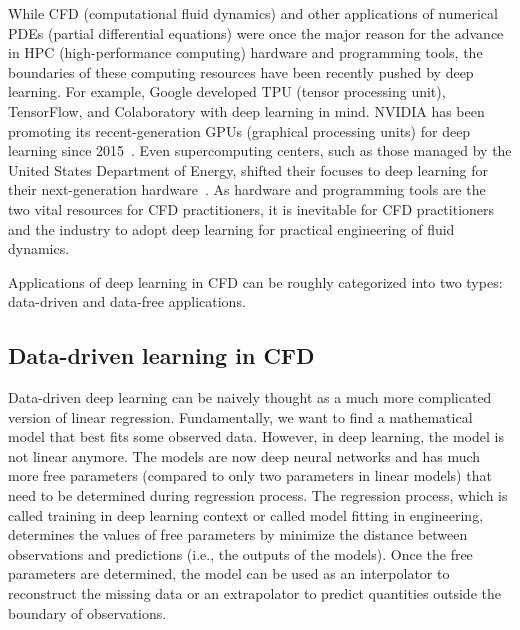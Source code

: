 
While CFD (computational fluid dynamics) and other applications of numerical PDEs (partial differential equations) were once the major reason for the advance in HPC (high-performance computing) hardware and programming tools, the boundaries of these computing resources have been recently pushed by deep learning.
For example, Google developed TPU (tensor processing unit), TensorFlow, and Colaboratory with deep learning in mind.
NVIDIA has been promoting its recent-generation GPUs (graphical processing units) for deep learning since 2015~\cite{buck_nvidias_2015}.
Even supercomputing centers, such as those managed by the United States Department of Energy, shifted their focuses to deep learning for their next-generation hardware~\cite{us_department_of_energy_argonne_2019}.
As hardware and programming tools are the two vital resources for CFD practitioners, it is inevitable for CFD practitioners and the industry to adopt deep learning for practical engineering of fluid dynamics.

Applications of deep learning in CFD can be roughly categorized into two types: data-driven and data-free applications.

\subsection*{Data-driven learning in CFD}

Data-driven deep learning can be naively thought as a much more complicated version of linear regression.
Fundamentally, we want to find a mathematical model that best fits some observed data.
However, in deep learning, the model is not linear anymore.
The models are now deep neural networks and has much more free parameters (compared to only two parameters in linear models) that need to be determined during regression process.
The regression process, which is called training in deep learning context or called model fitting in engineering, determines the values of free parameters by minimize the distance between observations and predictions (i.e., the outputs of the models).
Once the free parameters are determined, the model can be used as an interpolator to reconstruct the missing data or an extrapolator to predict quantities outside the boundary of observations.

